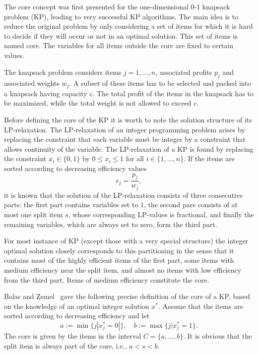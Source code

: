 
The core concept was first presented for the one-dimensional 0-1 knapsack problem (KP),
leading to very successful KP algorithms.
The main idea is to reduce the original problem by only considering a set of
items for which it is hard to decide if they will occur or not in an optimal solution.
This set of items is named core.
The variables for all items outside the core are fixed to certain values.

The knapsack problem considers items $j = 1, \ldots, n$, associated profits $p_j$ and
associated weights $w_j$.
A subset of these items has to be selected and packed into a knapsack having capacity $c$.
The total profit of the items in the knapsack has to be maximized, while the
total weight is not allowed to exceed $c$.

Before defining the core of the KP it is worth to note the solution structure
of its LP-relaxation.
The LP-relaxation of an integer programming problem arises by replacing the
constraint that each variable must be integer by a constraint that allows
continuity of the variable.
The LP-relaxation of a KP is found by replacing the constraint $x_i \in \{0,1\}$
by $0 \leqslant x_i \leqslant 1$ for all $i \in \{1, \ldots, n\}$.
If the items are sorted according to decreasing efficiency values
\begin{equation}
  e_j = \frac{p_j}{w_j},
\end{equation}
it is known that the solution of the LP-relaxation consists of
three consecutive parts: the first part contains variables set to $1$, the second
pare consists of at most one split item $s$, whose corresponding LP-values is
fractional, and finally the remaining variables, which are always set to zero,
form the third part.

For most instance of KP (except those with a very special structure) the integer
optimal solution closely corresponds to this partitioning in the sense that it
contains most of the highly efficient items of the first part, some items with
medium efficiency near the split item, and almost no items with low efficiency
from the third part.
Items of medium efficiency constitute the core.

Balas and Zemel~\cite{balas1980algorithm} gave the following precise definition
of the core of a KP, based on the knowledge of an optimal integer solution $x^*$.
Assume that the items are sorted according to decreasing efficiency and let
\begin{equation}
  a := \min\{ j | x_j^* = 0 |\}, \quad b := \max\{ j | x_j^* = 1 \}.
\end{equation}
The core is given by the items in the interval $C = \{a, \ldots, b\}$.
It is obvious that the split item is always part of the core, i.e., $a < s < b$.

